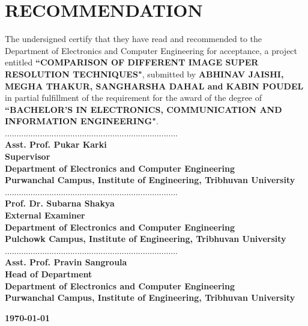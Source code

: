 \newpage
{}
\section*{RECOMMENDATION}
The undersigned certify that they have read and recommended to the Department of
Electronics and Computer Engineering for acceptance, a project entitled \textbf{``COMPARISON OF DIFFERENT IMAGE SUPER RESOLUTION TECHNIQUES"}, submitted by \textbf{ABHINAV JAISHI, MEGHA THAKUR, SANGHARSHA DAHAL and KABIN POUDEL} in partial fulfillment of the requirement for the award of the degree of \textbf{``BACHELOR'S IN ELECTRONICS, COMMUNICATION AND INFORMATION ENGINEERING"}.
        \vspace{1cm} \\
..........................................................................\\
\textbf{Asst. Prof. Pukar Karki\\
Supervisor\\
Department of Electronics and Computer Engineering\\
Purwanchal Campus, Institute of Engineering, Tribhuvan University}
        \vspace{1cm} \\
..........................................................................\\
\textbf{Prof. Dr. Subarna Shakya\\
External Examiner \\
Department of Electronics and Computer Engineering\\
Pulchowk Campus, Institute of Engineering, Tribhuvan University}
        \vspace{1cm} \\
..........................................................................\\
\textbf{
Asst. Prof. Pravin Sangroula\\ 
Head of Department \\
Department of Electronics and Computer Engineering\\Purwanchal Campus, Institute of Engineering, Tribhuvan University}\par
\vspace{2.5cm}

\begin{center}
\textbf{\today}
\end{center}